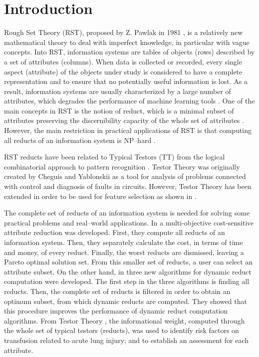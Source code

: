 \documentclass[number,preprint,review,12pt]{elsarticle}
\begin{document}
\section{Introduction}
  Rough Set Theory (RST), proposed by Z. Pawlak in 1981 \citep{Pawlak81,Pawlak81-2,Pawlak82,Pawlak91}, 
  is a relatively new mathematical theory to deal with imperfect knowledge, in particular with vague 
  concepts. Into RST, information systems are tables of objects (rows) described by a set of attributes (columns). 
  When data is collected or recorded, every single aspect (attribute) of the objects under study is
  considered to have a complete representation and to ensure that no potentially useful information is lost. As a result, information systems are usually characterized by a large number of attributes, which degrades the performance of machine learning tools \citep{Parthalain08}. One of the main concepts in RST is the notion of reduct, which is a minimal subset of attributes preserving the discernibility capacity of the whole set of attributes \citep{Pawlak91}. However, the main restriction in practical applications of RST is that computing all reducts of an information system is NP--hard \citep{Skowron92}. 
   
   RST reducts have been related to Typical Testors (TT) from the logical combinatorial approach to pattern recognition \citep{Chikalov2013}. Testor Theory was originally created by Cheguis and Yablonskii \cite{Cheguis55} as a tool for analysis of problems connected with control and diagnosis of faults in circuits.  However, Testor Theory has been extended in order to be used for feature selection as shown in \citep{Dmitriev1966,Martinez01,Ruiz08}.

  The complete set of reducts of an information system is needed for solving some practical problems and real--world applications. In \cite{Xu2013} a multi-objective cost-sensitive attribute reduction was developed. First, they compute all reducts of an information system. Then, they separately calculate the cost, in terms of time and money, of every reduct. Finally, the worst reducts are dismissed, leaving a Pareto optimal solution set. From this smaller set of reducts, a user can  select an attribute subset. On the other hand, in \cite{Mukamakuza2014} three new algorithms for dynamic reduct computation were developed. The first step in the three algorithms is finding all reducts. Then, the complete set of reducts is filtered in order to obtain an optimum subset, from which dynamic reducts are computed. They showed that this procedure improves the performance of dynamic reduct computation algorithms. From Testor Theory \cite{Torres2014}, the informational weight, computed through the whole set of typical testors (reducts), was used to identify risk factors on transfusion related to acute lung injury; and to establish an assessment for each attribute.  
  
\end{document}
